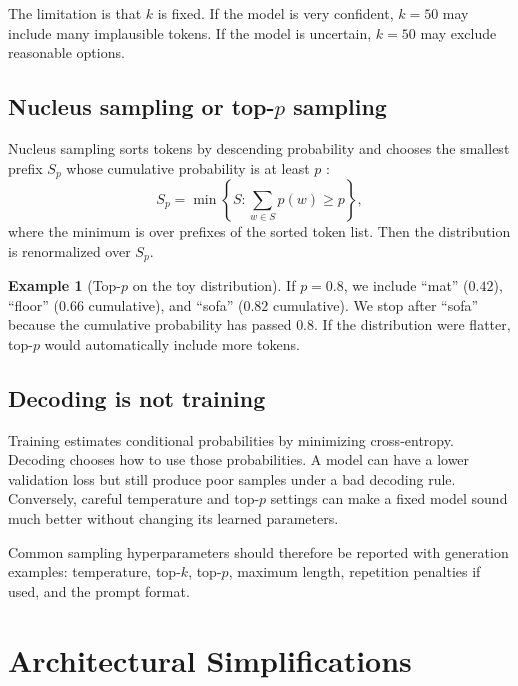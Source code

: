 \documentclass[11pt,a4paper]{article}
\theoremstyle{definition}
\newtheorem{example}{Example}[section]
\theoremstyle{plain}
\begin{document}
The limitation is that $k$ is fixed. If the model is very confident, $k=50$ may include many implausible tokens. If the model is uncertain, $k=50$ may exclude reasonable options.

\subsection{Nucleus sampling or top-$p$ sampling}

Nucleus sampling sorts tokens by descending probability and chooses the smallest prefix $S_p$ whose cumulative probability is at least $p$ \cite{holtzman2019nucleus}:
\begin{equation}
    S_p=\min\left\{S:\sum_{w\in S}p(w)\geq p\right\},
\end{equation}
where the minimum is over prefixes of the sorted token list. Then the distribution is renormalized over $S_p$.

\begin{example}[Top-$p$ on the toy distribution]
If $p=0.8$, we include ``mat'' ($0.42$), ``floor'' ($0.66$ cumulative), and ``sofa'' ($0.82$ cumulative). We stop after ``sofa'' because the cumulative probability has passed $0.8$. If the distribution were flatter, top-$p$ would automatically include more tokens.
\end{example}

\subsection{Decoding is not training}

\begin{motivationbox}
Training estimates conditional probabilities by minimizing cross-entropy. Decoding chooses how to use those probabilities. A model can have a lower validation loss but still produce poor samples under a bad decoding rule. Conversely, careful temperature and top-$p$ settings can make a fixed model sound much better without changing its learned parameters.
\end{motivationbox}

Common sampling hyperparameters should therefore be reported with generation examples: temperature, top-$k$, top-$p$, maximum length, repetition penalties if used, and the prompt format.


\section{Architectural Simplifications}
\label{sec:simplifications}
\end{document}
